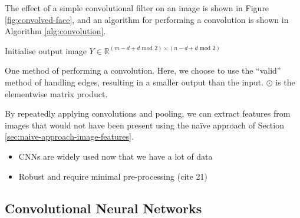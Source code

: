         The effect of a simple convolutional filter on an image is shown in
        Figure \ref{fig:convolved-face}, and an algorithm for performing a
        convolution is shown in Algorithm \ref{alg:convolution}.

        \begin{algorithm}[!ht]

            Initialise output image $Y \in \mathbb{R}^{(m - d + d \text{ mod } 2) \times (n - d + d \text{ mod } 2)}$\;

            \caption{One method of performing a convolution. Here, we choose to
                use the ``valid'' method of handling edges, resulting in a
                smaller output than the input. $\odot$ is the elementwise
                matrix product.}
            \label{alg:convolution}
        \end{algorithm}

        By repeatedly applying convolutions and pooling, we can extract features
        from images that would not have been present using the na\"ive approach
        of Section \ref{sec:naive-approach-image-features}.

        \begin{itemize}
            \item CNNs are widely used now that we have a lot of data
            \item Robust and require minimal pre-processing (cite 21)
        \end{itemize}

    \subsection{Convolutional Neural Networks}
    \label{sec:convolutional-neural-networks}

